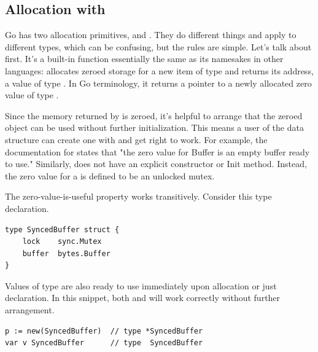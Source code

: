 \subsection{Allocation with }
Go has two allocation primitives,  and . They do different
things and apply to different types, which can be confusing, but the
rules are simple. Let's talk about  first. It's a built-in function
essentially the same as its namesakes in other languages: 
allocates zeroed storage for a new item of type  and returns its
address, a value of type . In Go terminology, it returns a pointer to
a newly allocated zero value of type .

Since the memory returned by  is zeroed, it's helpful to arrange
that the zeroed object can be used without further initialization. This
means a user of the data structure can create one with  and get
right to work. For example, the documentation for  states
that "the zero value for Buffer is an empty buffer ready to use."
Similarly,  does not have an explicit constructor or Init
method. Instead, the zero value for a  is defined to be an
unlocked mutex.

The zero-value-is-useful property works transitively. Consider this type
declaration.

\begin{lstlisting}
type SyncedBuffer struct {
    lock    sync.Mutex
    buffer  bytes.Buffer
}
\end{lstlisting}
Values of type  are also ready to use immediately upon
allocation or just declaration. In this snippet, both  and
 will work
correctly without further arrangement.
\begin{lstlisting}
p := new(SyncedBuffer)  // type *SyncedBuffer
var v SyncedBuffer      // type  SyncedBuffer
\end{lstlisting}

